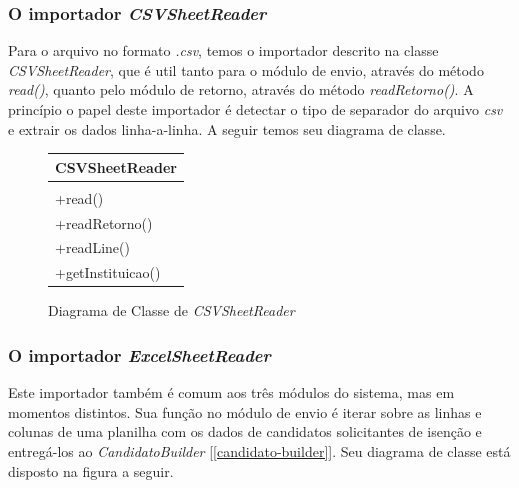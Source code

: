 \documentclass[
	12pt,			%
	openright,		%
	oneside,	
	a4paper,		%
	english,		%
	brazil			%
]{abntex2/abntex2}  %
\begin{document}
				\subsubsection{O importador \textit{CSVSheetReader}}
	
					Para o arquivo no formato \textit{.csv}, temos o importador descrito na classe \textit{CSVSheetReader}, que é util tanto para o módulo de envio, através do método \textit{read()}, quanto pelo módulo de retorno, através do método \textit{readRetorno()}. A princípio o papel deste importador é detectar o tipo de separador do arquivo \textit{csv} e extrair os dados linha-a-linha. A seguir temos seu diagrama de classe.
	
					\begin{figure}[ht]
						\begin{center}
							
							\caption{Diagrama de Classe de \textit{CSVSheetReader}}
							
							\begin{tabular}{|l|}
								\hline
								\multicolumn{1}{|c|}{\textbf{CSVSheetReader}} \\ \hline
								\\ \hline
								+read() \\
								+readRetorno() \\
								+readLine() \\
								+getInstituicao() \\ \hline
							\end{tabular}
							
						\end{center}
					\end{figure}
	
				\subsubsection{O importador \textit{ExcelSheetReader}}

					Este importador também é comum aos três módulos do sistema, mas em momentos distintos. Sua função no módulo de envio é iterar sobre as linhas e colunas de uma planilha com os dados de candidatos solicitantes de isenção e entregá-los ao \textit{CandidatoBuilder} [\ref{candidato-builder}]. Seu diagrama de classe está disposto na figura a seguir.
\end{document}
